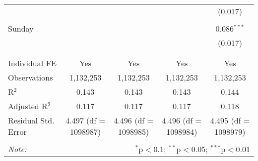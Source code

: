 \documentclass[
]{article}
\begin{document}
\begin{table}[!htbp]
{\begin{tabular}{@{\extracolsep{5pt}}lcccc}
  &  &  &  & (0.017) \\ 
  & & & & \\ 
 Sunday &  &  &  & 0.086$^{***}$ \\ 
  &  &  &  & (0.017) \\ 
  & & & & \\ 
\hline \\[-1.8ex] 
Individual FE & Yes & Yes & Yes & Yes \\ 
Observations & 1,132,253 & 1,132,253 & 1,132,253 & 1,132,253 \\ 
R$^{2}$ & 0.143 & 0.143 & 0.143 & 0.144 \\ 
Adjusted R$^{2}$ & 0.117 & 0.117 & 0.117 & 0.118 \\ 
Residual Std. Error & 4.497 (df = 1098987) & 4.496 (df = 1098985) & 4.496 (df = 1098984) & 4.495 (df = 1098979) \\ 
\hline 
\hline \\[-1.8ex] 
\textit{Note:}  & \multicolumn{4}{r}{$^{*}$p$<$0.1; $^{**}$p$<$0.05; $^{***}$p$<$0.01} \\ 
\end{tabular}
} 
\end{table} 
\newpage
\end{document}
